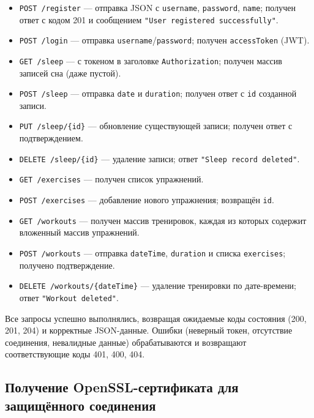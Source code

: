 \begin{itemize}
    \item \texttt{POST /register} — отправка JSON с \texttt{username}, \texttt{password}, \texttt{name}; получен ответ с кодом 201 и сообщением \texttt{"User registered successfully"}.
    \item \texttt{POST /login} — отправка \texttt{username}/\texttt{password}; получен \texttt{accessToken} (JWT).
    \item \texttt{GET /sleep} — с токеном в заголовке \texttt{Authorization}; получен массив записей сна (даже пустой).
    \item \texttt{POST /sleep} — отправка \texttt{date} и \texttt{duration}; получен ответ с \texttt{id} созданной записи.
    \item \texttt{PUT /sleep/\{id\}} — обновление существующей записи; получен ответ с подтверждением.
    \item \texttt{DELETE /sleep/\{id\}} — удаление записи; ответ \texttt{"Sleep record deleted"}.
    \item \texttt{GET /exercises} — получен список упражнений.
    \item \texttt{POST /exercises} — добавление нового упражнения; возвращён \texttt{id}.
    \item \texttt{GET /workouts} — получен массив тренировок, каждая из которых содержит вложенный массив упражнений.
    \item \texttt{POST /workouts} — отправка \texttt{dateTime}, \texttt{duration} и списка \texttt{exercises}; получено подтверждение.
    \item \texttt{DELETE /workouts/\{dateTime\}} — удаление тренировки по дате-времени; ответ \texttt{"Workout deleted"}.
\end{itemize}

Все запросы успешно выполнялись, возвращая ожидаемые коды состояния (200, 201, 204) и корректные JSON-данные. Ошибки (неверный токен, отсутствие соединения, невалидные данные) обрабатываются и возвращают соответствующие коды 401, 400, 404.

\subsection{Получение OpenSSL-сертификата для защищённого соединения}

